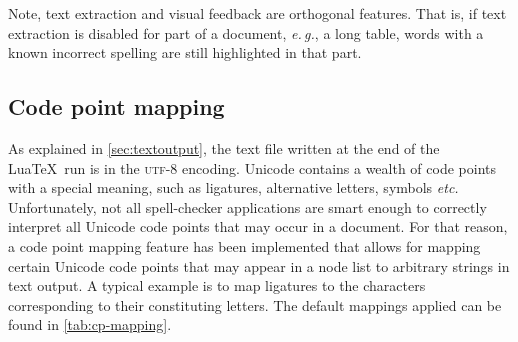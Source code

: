 \documentclass[11pt]{article}
\newcommand*{\acr}[1]{\mbox{\scshape#1}}
\newcommand*{\latinphrase}[1]{\foreignlanguage{latin}{\emph{#1}}}
\newcommand*{\lpeg}{\latinphrase{e.\,g.}\xspace}
\newcommand*{\lpetc}{\latinphrase{etc.}\xspace}
\begin{document}
Note, text extraction and visual feedback are orthogonal features.  That
is, if text extraction is disabled for part of a document, \lpeg, a long
table, words with a known incorrect spelling are still highlighted in
that part.


\subsection{Code point mapping}
\label{sec:cp-mapping}

As explained in \autoref{sec:textoutput}, the text file written at the
end of the Lua\TeX\ run is in the \acr{utf-8} encoding.  Unicode
contains a wealth of code points with a special meaning, such as
ligatures, alternative letters, symbols \lpetc Unfortunately, not all
spell-checker applications are smart enough to correctly interpret all
Unicode code points that may occur in a document.  For that reason, a
code point mapping feature has been implemented that allows for mapping
certain Unicode code points that may appear in a node list to arbitrary
strings in text output.  A typical example is to map ligatures to the
characters corresponding to their constituting letters.  The default
mappings applied can be found in \autoref{tab:cp-mapping}.
\end{document}
